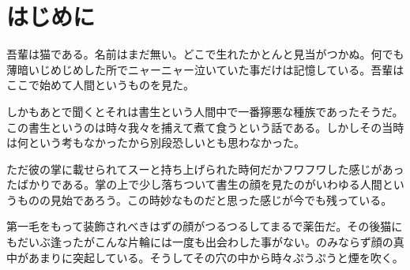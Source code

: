 \documentclass[a5paper]{ltjtarticle}
\begin{document}
\section{はじめに}
吾輩は猫である。名前はまだ無い。どこで生れたかとんと見当がつかぬ。何でも薄暗いじめじめした所でニャーニャー泣いていた事だけは記憶している。吾輩はここで始めて人間というものを見た。

しかもあとで聞くとそれは書生という人間中で一番獰悪な種族であったそうだ。この書生というのは時々我々を捕えて煮て食うという話である。しかしその当時は何という考もなかったから別段恐しいとも思わなかった。

ただ彼の掌に載せられてスーと持ち上げられた時何だかフワフワした感じがあったばかりである。掌の上で少し落ちついて書生の顔を見たのがいわゆる人間というものの見始であろう。この時妙なものだと思った感じが今でも残っている。

第一毛をもって装飾されべきはずの顔がつるつるしてまるで薬缶だ。その後猫にもだいぶ逢ったがこんな片輪には一度も出会わした事がない。のみならず顔の真中があまりに突起している。そうしてその穴の中から時々ぷうぷうと煙を吹く。
\end{document}
